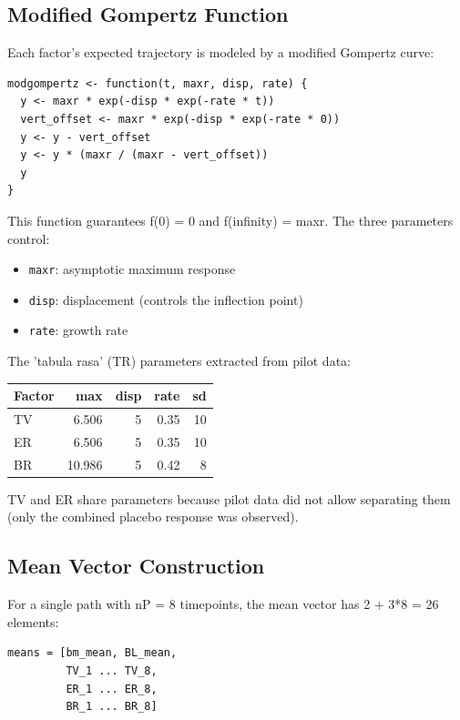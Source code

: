 \documentclass[11pt]{article}
\begin{document}
\subsection{Modified Gompertz Function}

Each factor's expected trajectory is modeled by a modified
Gompertz curve:

\begin{lstlisting}
modgompertz <- function(t, maxr, disp, rate) {
  y <- maxr * exp(-disp * exp(-rate * t))
  vert_offset <- maxr * exp(-disp * exp(-rate * 0))
  y <- y - vert_offset
  y <- y * (maxr / (maxr - vert_offset))
  y
}
\end{lstlisting}

This function guarantees f(0) = 0 and f(infinity) = maxr. The
three parameters control:

\begin{itemize}
  \item \texttt{maxr}: asymptotic maximum response
  \item \texttt{disp}: displacement (controls the inflection point)
  \item \texttt{rate}: growth rate
\end{itemize}

The 'tabula rasa' (TR) parameters extracted from pilot data:

\begin{table}[h]
\centering
\begin{tabular}{lrrrr}
\toprule
Factor & max & disp & rate & sd \\
\midrule
TV & 6.506 & 5 & 0.35 & 10 \\
ER & 6.506 & 5 & 0.35 & 10 \\
BR & 10.986 & 5 & 0.42 & 8 \\
\bottomrule
\end{tabular}
\end{table}

TV and ER share parameters because pilot data did not allow
separating them (only the combined placebo response was
observed).

\subsection{Mean Vector Construction}

For a single path with nP = 8 timepoints, the mean vector has
2 + 3*8 = 26 elements:

\begin{verbatim}
means = [bm_mean, BL_mean,
         TV_1 ... TV_8,
         ER_1 ... ER_8,
         BR_1 ... BR_8]
\end{verbatim}
\end{document}
